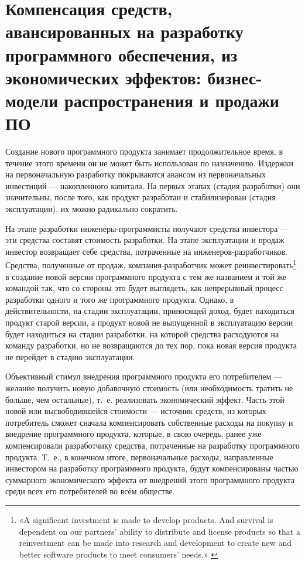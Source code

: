 \documentclass{article}
\begin{document}
\section*{Компенсация средств, авансированных на разработку программного обеспечения, из экономических эффектов: бизнес-модели распространения и продажи ПО}

Создание нового программного продукта занимает продолжительное время, в течение этого времени он не может быть использован по назначению. Издержки на первоначальную разработку покрываются авансом из первоначальных инвестиций — накопленного капитала. На первых этапах (стадия разработки) они значительны, после того, как продукт разработан и стабилизирован (стадия эксплуатации), их можно радикально сократить.

На этапе разработки инженеры-программисты получают средства инвестора — эти средства составят стоимость разработки. На этапе эксплуатации и продаж инвестор возвращает себе средства, потраченные на инженеров-разработчиков. Средства, полученные от продаж, компания-разработчик может реинвестировать\footnote{«A significant investment is made to develop products. And survival is dependent on our partners’ ability to distribute and license products so that a reinvestment can be made into research and development to create new and better software products to meet consumers’ needs.» \cite{microsoftPiracyReinvest}} в создание новой версии программного продукта с тем же названием и той же командой так, что со стороны это будет выглядеть, как непрерывный процесс разработки одного и того же программного продукта. Однако, в действительности, на стадии эксплуатации, приносящей доход, будет находиться продукт старой версии, а продукт новой не выпущенной в эксплуатацию версии будет находиться на стадии разработки, на которой средства расходуются на команду разработки, но не возвращаются до тех пор, пока новая версия продукта не перейдет в стадию эксплуатации.

Объективный стимул внедрения программного продукта его потребителем — желание получить новую добавочную стоимость (или необходимость тратить не больше, чем остальные), т.~е. реализовать экономический эффект. Часть этой новой или высвободившейся стоимости — источник средств, из которых потребитель сможет сначала компенсировать собственные расходы на покупку и внедрение программного продукта, которые, в свою очередь, ранее уже компенсировали разработчику средства, потраченные на разработку программного продукта. Т.~е., в конечном итоге, первоначальные расходы, направленные инвестором на разработку программного продукта, будут компенсированы частью суммарного экономического эффекта от внедрений этого программного продукта среди всех его потребителей во всём обществе.
\end{document}
